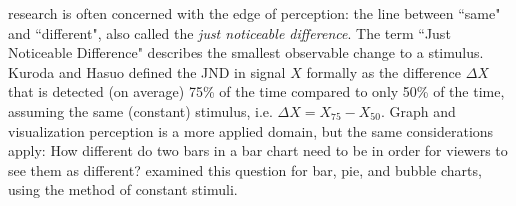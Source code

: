 




\maketitle
\tableofcontents








% 
% 
% 
% 

 research is often concerned with the edge of perception: the line between ``same" and ``different", also called the \emph{just noticeable difference}.
The term ``Just Noticeable Difference" describes the smallest observable change to a stimulus. Kuroda and Hasuo \cite{psychophysical} defined the JND in signal $X$ formally as the difference  $\Delta X$ that is detected (on average) 75\% of the time compared to only 50\% of the time, assuming the same (constant) stimulus, i.e. $\Delta X = X_{75} - X_{50}$.
Graph and visualization perception is a more applied domain, but the same considerations apply: How different do two bars in a bar chart need to be in order for viewers to see them as different? 
\cite{JNDVIS21} examined this question for bar, pie, and bubble charts, using the method of constant stimuli. 

